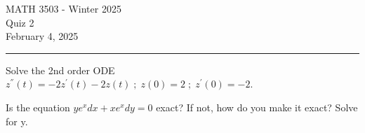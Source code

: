 \documentclass[12pt,letterpaper, onecolumn]{exam}
\begin{document}
\begingroup  
    \centering
    \LARGE MATH 3503 - Winter 2025\\
    \LARGE Quiz 2\\[0.5em]
    \large February 4, 2025\\[0.5em]
\endgroup
\rule{\textwidth}{0.4pt}
\pointsdroppedatright   %
\printanswers
\renewcommand{\solutiontitle}{\noindent\textbf{Ans:}\enspace}   %

\begin{questions}
    
    \question[4 Marks] Solve the 2nd order ODE $z^{''}(t) = -2 z^{'}(t) - 2 z(t) \; ; \; z(0) = 2 \; ; \; z^{'}(0) = -2$.\droppoints
    
    \pagebreak %
\thispagestyle{empty}   %
    
    \question[6 Marks] Is the equation $y e^x dx + x e^x dy = 0$ exact? If not, how do you make it exact? Solve for y.\droppoints
    
\end{questions}
\end{document}
